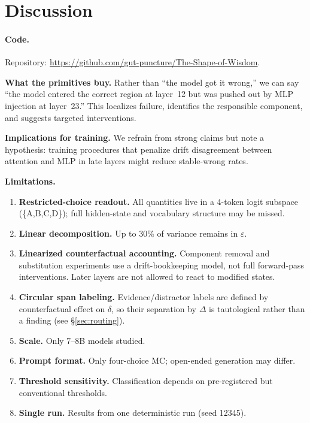 \documentclass{article}
\begin{document}
\section{Discussion}
\label{sec:discussion}

\paragraph{Code.}  Repository: \url{https://github.com/gut-puncture/The-Shape-of-Wisdom}.

\textbf{What the primitives buy.}  Rather than ``the model got it wrong,'' we can say ``the model entered the correct region at layer~12 but was pushed out by MLP injection at layer~23.''  This localizes failure, identifies the responsible component, and suggests targeted interventions.

\textbf{Implications for training.}  We refrain from strong claims but note a hypothesis: training procedures that penalize drift disagreement between attention and MLP in late layers might reduce stable-wrong rates.

\textbf{Limitations.}
\vspace{-0.5em}
\begin{enumerate}\setlength{\itemsep}{0pt}
\item \textbf{Restricted-choice readout.}  All quantities live in a 4-token logit subspace (\{A,B,C,D\}); full hidden-state and vocabulary structure may be missed.
\item \textbf{Linear decomposition.}  Up to 30\% of variance remains in $\varepsilon$.
\item \textbf{Linearized counterfactual accounting.}  Component removal and substitution experiments use a drift-bookkeeping model, not full forward-pass interventions.  Later layers are not allowed to react to modified states.
\item \textbf{Circular span labeling.}  Evidence/distractor labels are defined by counterfactual effect on $\delta$, so their separation by $\Delta$ is tautological rather than a finding (see \S\ref{sec:routing}).
\item \textbf{Scale.}  Only 7--8B models studied.
\item \textbf{Prompt format.}  Only four-choice MC; open-ended generation may differ.
\item \textbf{Threshold sensitivity.}  Classification depends on pre-registered but conventional thresholds.
\item \textbf{Single run.}  Results from one deterministic run (seed 12345).
\end{enumerate}
\end{document}
